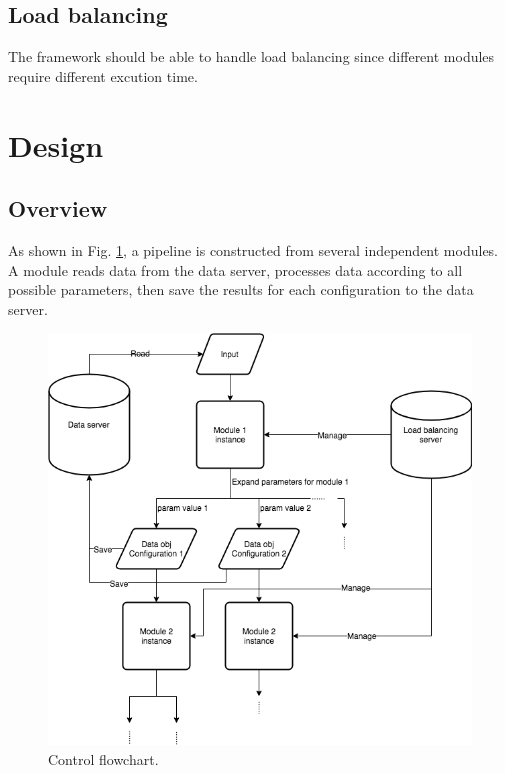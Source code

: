 \documentclass{article}
\begin{document}
    \subsection{Load balancing}
    The framework should be able to handle load balancing since different modules require different excution time.

\section{Design}

    \subsection{Overview}

    As shown in Fig. \ref{fig:control_flow},
    a pipeline is constructed from several independent modules.
    A module reads data from the data server,
    processes data according to all possible parameters,
    then save the results for each configuration to the data server.

    \begin{figure}[h]
        \begin{center}
            \includegraphics[width=\textwidth]{fig/control_flow.png}
        \end{center}
        \caption{Control flowchart.}\label{fig:control_flow}
    \end{figure}
\end{document}
